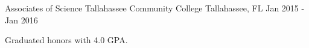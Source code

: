

\begin{cventries}

  \cventry
    {Associates of Science} %
    {Tallahassee Community College} %
    {Tallahassee, FL} %
    {Jan 2015 - Jan 2016} %
    {
      \begin{cvitems} %
        \item {Graduated honors with 4.0 GPA.}
      \end{cvitems}
    }

\end{cventries}
